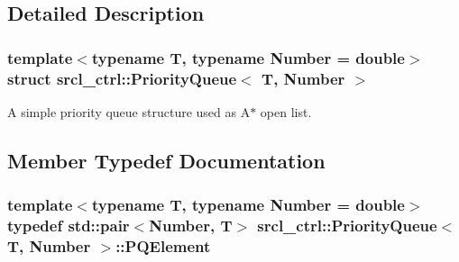 \subsection{Detailed Description}
\subsubsection*{template$<$typename T, typename Number = double$>$struct srcl\-\_\-ctrl\-::\-Priority\-Queue$<$ T, Number $>$}

A simple priority queue structure used as A$\ast$ open list. 

\subsection{Member Typedef Documentation}
\hypertarget{structsrcl__ctrl_1_1PriorityQueue_a13adb99a78e01b3fbf453e6bc5b8ce39}{
\subsubsection[{P\-Q\-Element}]{\setlength{\rightskip}{0pt plus 5cm}template$<$typename T, typename Number = double$>$ typedef std\-::pair$<$Number, T$>$ {\bf srcl\-\_\-ctrl\-::\-Priority\-Queue}$<$ T, Number $>$\-::{\bf P\-Q\-Element}}}\label{structsrcl__ctrl_1_1PriorityQueue_a13adb99a78e01b3fbf453e6bc5b8ce39}


